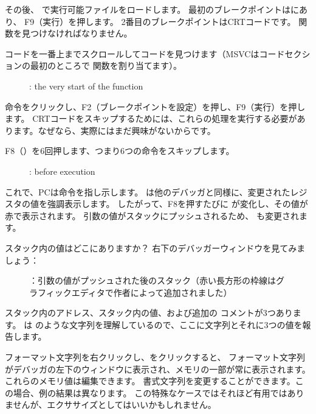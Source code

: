 その後、 \olly で実行可能ファイルをロードします。 
最初のブレークポイントはにあり、
F9（実行）を押します。 
2番目のブレークポイントは\ac{CRT}コードです。 
\main 関数を見つけなければなりません。

コードを一番上までスクロールしてコードを見つけます（MSVCはコードセクションの最初のところで \main 関数を割り当てます）。
\begin{figure}[H]
\centering
{}
\caption{\olly: the very start of the \main function}
\label{fig:printf3_olly_1}
\end{figure}

命令をクリックし、F2（ブレークポイントを設定）を押し、F9（実行）を押します。 
\ac{CRT}コードをスキップするためには、これらの処理を実行する必要があります。なぜなら、実際にはまだ興味がないからです。

\clearpage
F8（\stepover）を6回押します、つまり6つの命令をスキップします。

\begin{figure}[H]
\centering
{}
\caption{\olly: before \printf execution}
\label{fig:printf3_olly_2}
\end{figure}

これで、\ac{PC}は命令を指し示します。 
\olly は他のデバッガと同様に、変更されたレジスタの値を強調表示します。 
したがって、F8を押すたびに \EIP が変化し、その値が赤で表示されます。 
引数の値がスタックにプッシュされるため、 \ESP も変更されます。

スタック内の値はどこにありますか？ 
右下のデバッガーウィンドウを見てみましょう：

\begin{figure}[H]
\centering

\caption{\olly ：引数の値がプッシュされた後のスタック（赤い長方形の枠線はグラフィックエディタで作者によって追加されました）}
\end{figure}

スタック内のアドレス、スタック内の値、および追加の \olly コメントが3つあります。 
\olly は \printf のような文字列を理解しているので、ここに文字列とそれに3つの値を報告します。

フォーマット文字列を右クリックし、をクリックすると、
フォーマット文字列がデバッガの左下のウィンドウに表示され、メモリの一部が常に表示されます。 
これらのメモリ値は編集できます。 
書式文字列を変更することができます。この場合、例の結果は異なります。 
この特殊なケースではそれほど有用ではありませんが、エクササイズとしてはいいかもしれません。

